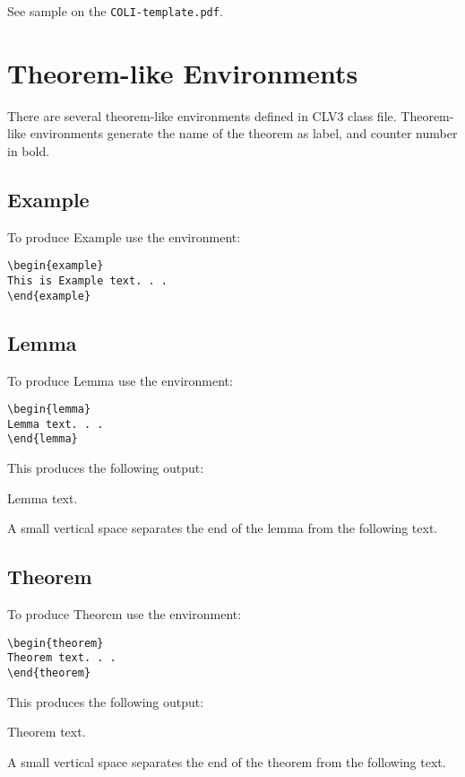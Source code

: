 \documentclass{clv3}
\begin{document}
\noindent See sample on the {\tt COLI-template.pdf}.

\section{Theorem-like Environments}

There are several theorem-like environments defined in CLV3 class file. Theorem-like
environments generate the name of the theorem as label, and counter number in bold.

\subsection{Example}

To produce Example use the environment:

\begin{verbatim}
\begin{example}
This is Example text. . .
\end{example}
\end{verbatim}

\subsection{Lemma}

To produce Lemma use the environment:

\begin{verbatim}
\begin{lemma}
Lemma text. . .
\end{lemma}
\end{verbatim}

This produces the following output:
\begin{lemma}\label{lem}
Lemma text.
\end{lemma}
A small vertical space separates the end of the lemma
from the following text.

\subsection{Theorem}

To produce Theorem use the environment:

\begin{verbatim}
\begin{theorem}
Theorem text. . .
\end{theorem}
\end{verbatim}

This produces the following output:
\begin{theorem}\label{thm}
Theorem text.
\end{theorem}
\noindent
A small vertical space separates the end of the theorem
from the following text.
\end{document}
